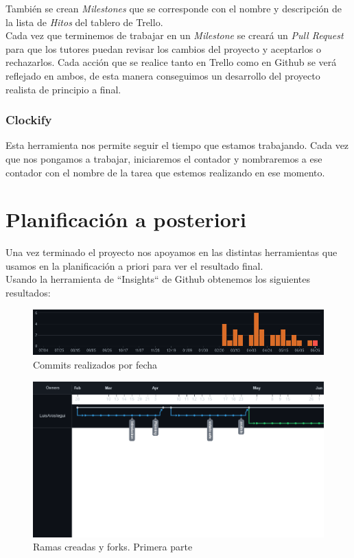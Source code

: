 También se crean \textit{Milestones} que se corresponde con el nombre y descripción de la lista de \textit{Hitos} del tablero de Trello.\\

Cada vez que terminemos de trabajar en un \textit{Milestone} se creará un \textit{Pull Request} para que los tutores puedan revisar los cambios del proyecto y aceptarlos o rechazarlos. Cada acción que se realice tanto en Trello como en Github se verá reflejado en ambos, de esta manera conseguimos un desarrollo del proyecto realista de principio a final.

\subsubsection{Clockify}

Esta herramienta nos permite seguir el tiempo que estamos trabajando. Cada vez que nos pongamos a trabajar, iniciaremos el contador y nombraremos a ese contador con el nombre de la tarea que estemos realizando en ese momento.

\section{Planificación a posteriori}

Una vez terminado el proyecto nos apoyamos en las distintas herramientas que usamos en la planificación a priori para ver el resultado final. \\

Usando la herramienta de ``Insights`` de Github obtenemos los siguientes resultados:


\begin{figure}[hb!]
    \centering
    \includegraphics[width=\linewidth]{imagenes/commits.png}
    \caption{Commits realizados por fecha}
    \label{fig:figure4-plan}
\end{figure}

\begin{figure}[hb!]
    \centering
    \includegraphics[width=\linewidth]{imagenes/canvas.png}
    \caption{Ramas creadas y forks. Primera parte}
    \label{fig:figure5-plan}
\end{figure}


